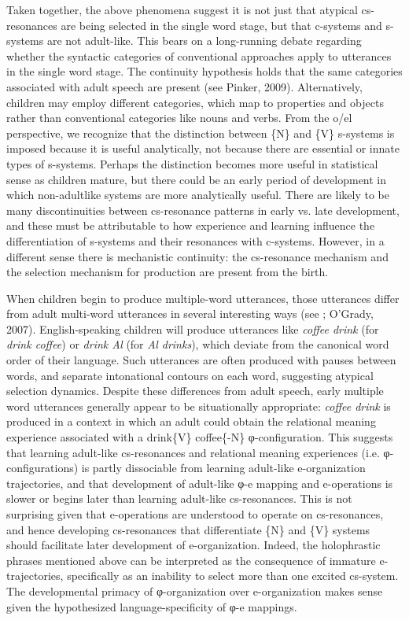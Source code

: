 Taken together, the above phenomena suggest it is not just that atypical cs-resonances are being selected in the single word stage, but that c-systems and s-systems are not adult-like. This bears on a long-running debate regarding whether the syntactic categories of conventional approaches apply to utterances in the single word stage. The continuity hypothesis holds that the same categories associated with adult speech are present (see Pinker, 2009). Alternatively, children may employ different categories, which map to properties and objects rather than conventional categories like nouns and verbs. From the o/el perspective, we recognize that the distinction between \{N\} and \{V\} s-systems is imposed because it is useful analytically, not because there are essential or innate types of s-systems. Perhaps the distinction becomes more useful in statistical sense as children mature, but there could be an early period of development in which non-adultlike systems are more analytically useful. There are likely to be many discontinuities between cs-resonance patterns in early vs. late development, and these must be attributable to how experience and learning influence the differentiation of s-systems and their resonances with c-systems. However, in a different sense there is mechanistic continuity: the cs-resonance mechanism and the selection mechanism for production are present from the birth.

When children begin to produce multiple-word utterances, those utterances differ from adult multi-word utterances in several interesting ways (see \citealt{Bloom1968}; O’Grady, 2007). English-speaking children will produce utterances like \textit{coffee drink} (for \textit{drink coffee}) or \textit{drink Al} (for \textit{Al drinks}), which deviate from the canonical word order of their language. Such utterances are often produced with pauses between words, and separate intonational contours on each word, suggesting atypical selection dynamics. Despite these differences from adult speech, early multiple word utterances generally appear to be situationally appropriate: \textit{coffee drink} is produced in a context in which an adult could obtain the relational meaning experience associated with a {\textbar}drink\{V\} coffee\{-N\}{\textbar} φ{}-configuration. This suggests that learning adult-like cs-resonances and relational meaning experiences (i.e. φ{}-configurations) is partly dissociable from learning adult-like e-organization trajectories, and that development of adult-like φ{}-e mapping and e-operations is slower or begins later than learning adult-like cs-resonances. This is not surprising given that e-operations are understood to operate on cs-resonances, and hence developing cs-resonances that differentiate \{N\} and \{V\} systems should facilitate later development of e-organization. Indeed, the holophrastic phrases mentioned above can be interpreted as the consequence of immature e-trajectories, specifically as an inability to select more than one excited cs-system. The developmental primacy of φ{}-organization over e-organization makes sense given the hypothesized language-specificity of φ{}-e mappings.


